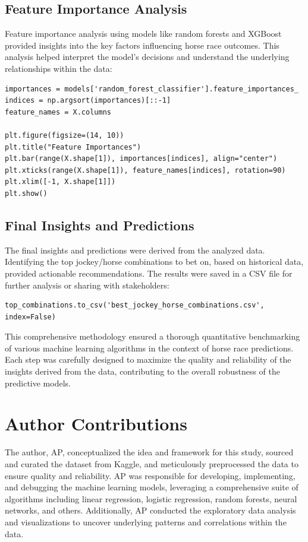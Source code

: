 \documentclass{article}
\begin{document}
\subsection*{Feature Importance Analysis}
Feature importance analysis using models like random forests and XGBoost provided insights into the key factors influencing horse race outcomes. This analysis helped interpret the model's decisions and understand the underlying relationships within the data:
\begin{verbatim}
importances = models['random_forest_classifier'].feature_importances_
indices = np.argsort(importances)[::-1]
feature_names = X.columns

plt.figure(figsize=(14, 10))
plt.title("Feature Importances")
plt.bar(range(X.shape[1]), importances[indices], align="center")
plt.xticks(range(X.shape[1]), feature_names[indices], rotation=90)
plt.xlim([-1, X.shape[1]])
plt.show()
\end{verbatim}

\subsection*{Final Insights and Predictions}
The final insights and predictions were derived from the analyzed data. Identifying the top jockey/horse combinations to bet on, based on historical data, provided actionable recommendations. The results were saved in a CSV file for further analysis or sharing with stakeholders:
\begin{verbatim}
top_combinations.to_csv('best_jockey_horse_combinations.csv', index=False)
\end{verbatim}

This comprehensive methodology ensured a thorough quantitative benchmarking of various machine learning algorithms in the context of horse race predictions. Each step was carefully designed to maximize the quality and reliability of the insights derived from the data, contributing to the overall robustness of the predictive models.

\section*{Author Contributions}

The author, AP, conceptualized the idea and framework for this study, sourced and curated the dataset from Kaggle, and meticulously preprocessed the data to ensure quality and reliability. AP was responsible for developing, implementing, and debugging the machine learning models, leveraging a comprehensive suite of algorithms including linear regression, logistic regression, random forests, neural networks, and others. Additionally, AP conducted the exploratory data analysis and visualizations to uncover underlying patterns and correlations within the data.
\end{document}

